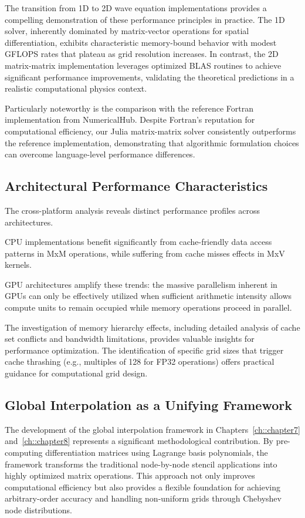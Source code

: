 The transition from 1D to 2D wave equation implementations provides a compelling demonstration of these performance principles in practice. The 1D solver, inherently dominated by matrix-vector operations for spatial differentiation, exhibits characteristic memory-bound behavior with modest GFLOPS rates that plateau as grid resolution increases. In contrast, the 2D matrix-matrix implementation leverages optimized BLAS routines to achieve significant performance improvements, validating the theoretical predictions in a realistic computational physics context.

Particularly noteworthy is the comparison with the reference Fortran implementation from NumericalHub. Despite Fortran's reputation for computational efficiency, our Julia matrix-matrix solver consistently outperforms the reference implementation, demonstrating that algorithmic formulation choices can overcome language-level performance differences.

\subsection*{Architectural Performance Characteristics}

The cross-platform analysis reveals distinct performance profiles across architectures.

CPU implementations benefit significantly from cache-friendly data access patterns in MxM operations, while suffering from cache misses effects in MxV kernels.

GPU architectures amplify these trends: the massive parallelism inherent in GPUs can only be effectively utilized when sufficient arithmetic intensity allows compute units to remain occupied while memory operations proceed in parallel.

The investigation of memory hierarchy effects, including detailed analysis of cache set conflicts and bandwidth limitations, provides valuable insights for performance optimization. The identification of specific grid sizes that trigger cache thrashing (e.g., multiples of 128 for FP32 operations) offers practical guidance for computational grid design.

\subsection*{Global Interpolation as a Unifying Framework}

The development of the global interpolation framework in Chapters~\ref{ch::chapter7} and~\ref{ch::chapter8} represents a significant methodological contribution. By pre-computing differentiation matrices using Lagrange basis polynomials, the framework transforms the traditional node-by-node stencil applications into highly optimized matrix operations. This approach not only improves computational efficiency but also provides a flexible foundation for achieving arbitrary-order accuracy and handling non-uniform grids through Chebyshev node distributions.

